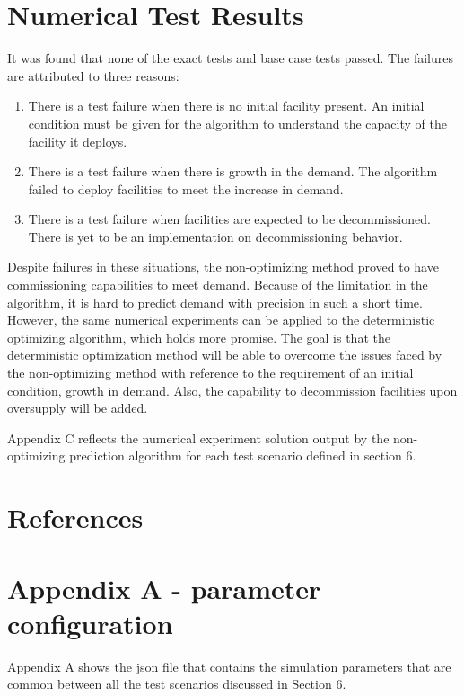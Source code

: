 \documentclass[11pt,letterpaper]{article}
\begin{document}
\section{Numerical Test Results}
It was found that none of the exact tests and base case tests passed. 
The failures are attributed to three reasons:

\begin{enumerate}
	\item There is a test failure when there is no initial facility present. An initial condition must be given for the algorithm to understand the capacity of the facility it deploys.
	\item There is a test failure when there is growth in the demand. The algorithm failed to deploy facilities to meet the increase in demand.
	\item There is a test failure when facilities are expected to be decommissioned. There is yet to be an implementation on decommissioning behavior.
\end{enumerate}

Despite failures in these situations, the non-optimizing method proved to have commissioning capabilities
to meet demand. Because of the limitation in the algorithm, it is hard to predict demand with precision
in such a short time. However, the same numerical experiments can be applied to the deterministic
optimizing algorithm, which holds more promise. The goal is that the deterministic optimization method
will be able to overcome the issues faced by the non-optimizing method with reference to the
requirement of an initial condition, growth in demand. Also, the capability to decommission facilities
upon oversupply will be added.

Appendix C reflects the numerical experiment solution output by the non-optimizing prediction algorithm for each test scenario defined in section 6. 

\pagebreak

\section{References}


\pagebreak

\section*{Appendix A - parameter configuration}
Appendix A shows the json file that contains the simulation parameters that are common between all the test scenarios discussed in Section 6.  
\end{document}
